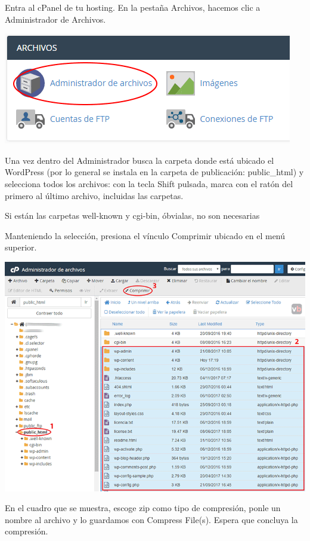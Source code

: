 \begin{enumerate}
		Entra al cPanel de tu hosting. En la pestaña Archivos, hacemos clic a Administrador de Archivos.
		
		\begin{center}
			\includegraphics[scale=0.5]{image/migra5.png}
		\end{center}
		
		Una vez dentro del Administrador busca la carpeta donde está ubicado el WordPress (por lo general se instala en la carpeta de publicación: public\_html) y selecciona todos los archivos: con la tecla Shift pulsada, marca con el ratón del primero al último archivo, incluidas las carpetas.
		
		Si están las carpetas well-known y cgi-bin, óbvialas, no son necesarias
		
		Manteniendo la selección, presiona el vínculo Comprimir ubicado en el menú superior.
		\begin{center}
			\includegraphics[scale=0.4]{image/migra6.png}
		\end{center}
		\newpage
		En el cuadro que se muestra, escoge zip como tipo de compresión, ponle un nombre al archivo y lo guardamos con Compress File(s). Espera que concluya la compresión.
		

\end{enumerate}
